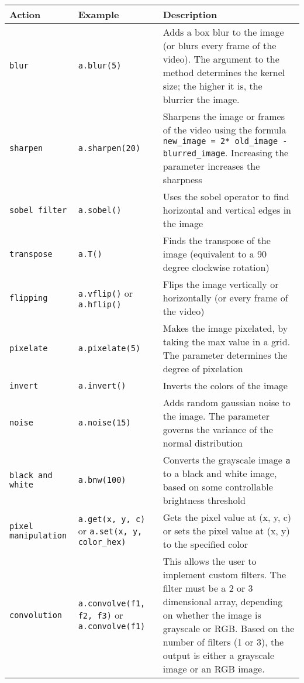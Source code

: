 \documentclass[a4paper, 11pt]{article}
\begin{document}
          \begin{tabular}{ |p{4cm}|p{5cm}|p{7cm}|  }
            \hline
            \textbf{Action} & \textbf{Example} & \textbf{Description}\\ 
            \hline
            \texttt{blur} & \texttt{a.blur(5)} & Adds a box blur to the image (or blurs every frame of the video). The argument to the method determines the kernel size; the higher it is, the blurrier the image.\\ \hline
            \texttt{sharpen} & \texttt{a.sharpen(20)} & Sharpens the image or frames of the video using the formula \texttt{new\_image = 2* old\_image - blurred\_image}. Increasing the parameter increases the sharpness\\ \hline
            \texttt{sobel filter} & \texttt{a.sobel()} & Uses the sobel operator to find horizontal and vertical edges in the image\\ \hline
            \texttt{transpose} & \texttt{a.T()} & Finds the transpose of the image (equivalent to a 90 degree clockwise rotation)\\ \hline
            \texttt{flipping} & \texttt{a.vflip()} or \texttt{a.hflip()}& Flips the image vertically or horizontally (or every frame of the video) \\ \hline
            \texttt{pixelate} & \texttt{a.pixelate(5)} & Makes the image pixelated, by taking the max value in a grid. The parameter determines the degree of pixelation\\ \hline
            \texttt{invert} & \texttt{a.invert()} & Inverts the colors of the image \\ \hline
            \texttt{noise} & \texttt{a.noise(15)} & Adds random gaussian noise to the image. The parameter governs the variance of the normal distribution \\ \hline
            \texttt{black and white} & \texttt{a.bnw(100)} & Converts the grayscale image \texttt{a} to a black and white image, based on some controllable brightness threshold \\ \hline
            \texttt{pixel manipulation} & \texttt{a.get(x, y, c)} or \texttt{a.set(x, y, color\_hex)} & Gets the pixel value at (x, y, c) or sets the pixel value at (x, y) to the specified color \\ \hline
            \texttt{convolution} & \texttt{a.convolve(f1, f2, f3)} or \texttt{a.convolve(f1)} & This allows the user to implement custom filters. The filter must be a 2 or 3 dimensional array, depending on whether the image is grayscale or RGB. Based on the number 
            of filters (1 or 3), the output is either a grayscale image or an RGB image. \\ \hline
           \end{tabular}
\end{document}

